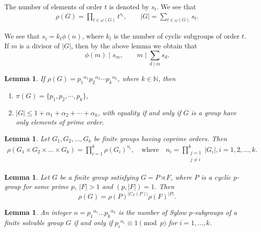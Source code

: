 \documentclass[12pt]{amsart}
\newtheorem{lemma}[theorem]{Lemma}
\theoremstyle{definition}
\begin{document}
The number of elements of order $t$ is denoted by $s_t$.
We see that
\begin{align} \label{yek}
	\rho(G)=\prod_{t \in \omega(G)} t^{s_t},
	\qquad
	|G|=\sum_{t \in \omega(G)}s_t.
\end{align}
	

	We see
that $s_t = k_t \phi(n)$, where $k_t$ is the number of cyclic subgroups of order $t$. If $m$ is a divisor of $|G|$, then by the above lemma we obtain that
\begin{equation} \label{star}
	\phi(m) \mid s_m, \qquad m \mid \sum_{d \mid m} s_d.
\end{equation}

	\begin{lemma} \cite[Lemma 2.2]{baniMal} \label{karan}
	If $\rho(G)={p_1}^{\alpha_1}{p_2}^{\alpha_2}\cdots{p_k}^{\alpha_k}$, where $k\in \mathbb{N}$, then
	\begin{enumerate}
		\item $\pi(G)=\{{p_1}, {p_2}, \cdots, {p_k}\}$,
		\item $|G| \leq 1+{\alpha_1}+{\alpha_2}+\cdots+{\alpha_k}$, with equality if and only if $G$ is a  group have only elements of prime order.
	\end{enumerate}
\end{lemma}
	\begin{lemma}\cite[Proposition 1.1]{TzbMATH06233336} \label{productdirect}
	Let $G_1, G_2, \dots, G_k$ be finite groups having coprime orders. Then
	\begin{align*}
		\rho(G_1 \times G_2 \times \dots \times G_k)= \prod_{i=1}^{k} {\rho(G_i)}^{n_i},\quad \text{where} \quad 
		n_i =\prod_{\substack{j=1 \\ j\neq i}}^{k}|G_i|, i=1, 2, \dots, k.
	\end{align*}
\end{lemma}
	\begin{lemma} \label{mid1}   \cite[Lemma 2.6]{baniAust}
	Let $ G  $ be a finite group satisfying  $ G = P  \rtimes F$, where $P$ is a cyclic $p$-group
	for some prime $p$, $|F| > 1$ and $(p,|F|) = 1$. Then
	\[\rho(G) = \rho(P)^{|C_{F}(P)|} \rho(F)^{|P|} .\]
\end{lemma}
	\begin{lemma}\cite{hallzbMATH02575957} \label{hall} 
	An integer $n = {p_1}^{\alpha_1} \dots {p_k}^{\alpha_k}$
	is the number of Sylow $p$-subgroups of a
	finite solvable group $G$ if and only if  ${p_i}^{\alpha_i} \equiv 1 \pmod{p}$
	for $i = 1, \dots, k$.
\end{lemma}
\end{document}
